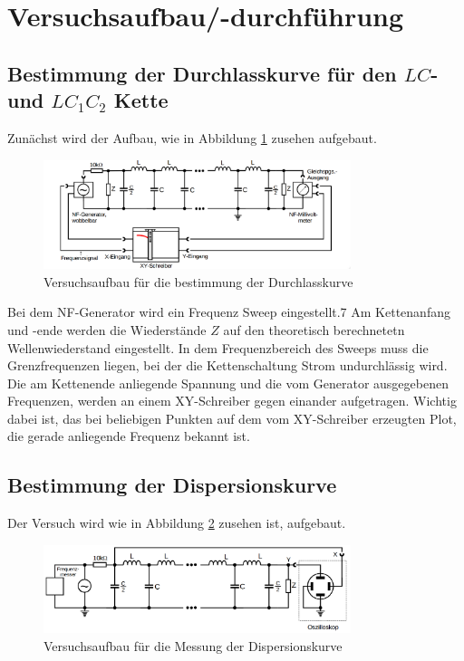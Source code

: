 \section{Versuchsaufbau/-durchführung}

\subsection{Bestimmung der Durchlasskurve für den $LC$- und $LC_1 C_2$ Kette}
Zunächst wird der Aufbau, wie in Abbildung \ref{fig:aufbau_durchlass} zusehen aufgebaut.
\begin{figure}
  \centering
  \includegraphics[width=0.8\textwidth]{bilder/versuchsaufbau_1.png}
  \caption{Versuchsaufbau für die bestimmung der Durchlasskurve}
  \label{fig:aufbau_durchlass}
\end{figure}

Bei dem NF-Generator wird ein Frequenz Sweep eingestellt.7
Am Kettenanfang und -ende werden die Wiederstände $Z$ auf den theoretisch 
berechnetetn Wellenwiederstand eingestellt.
In dem Frequenzbereich des Sweeps muss die Grenzfrequenzen liegen, bei der die 
Kettenschaltung Strom undurchlässig wird.
Die am Kettenende anliegende Spannung und die vom Generator ausgegebenen Frequenzen, 
werden an einem XY-Schreiber gegen einander aufgetragen.
Wichtig dabei ist, das bei beliebigen Punkten auf dem vom XY-Schreiber
erzeugten Plot, die gerade anliegende Frequenz bekannt ist. %


\subsection{Bestimmung der Dispersionskurve}
Der Versuch wird wie in Abbildung \ref{fig:aufbau_dispersion} zusehen ist, aufgebaut.
\begin{figure}
  \centering
  \includegraphics[width=0.8\textwidth]{bilder/versuchsaufbau_dispersion.png}
  \caption{Versuchsaufbau für die Messung der Dispersionskurve}
  \label{fig:aufbau_dispersion}
\end{figure}

